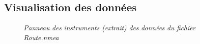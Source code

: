 \subsection{Visualisation des données}
\begin{center}
\begin{figure}[ht]
\caption{\label{data}\textit{Panneau des instruments (extrait) des données du fichier Route.nmea}}
\end{figure}
\end{center}
